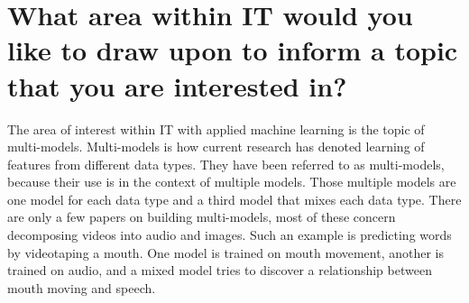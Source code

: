 \section{What area within IT would you like to draw upon to inform a topic that you are interested in?}

The area of interest within IT with applied machine learning is the topic of multi-models.  Multi-models is how current research has denoted learning of features from different data types.  They have been referred to as multi-models, because their use is in the context of multiple models.  Those multiple models are one model for each data type and a third model that mixes each data type. There are only a few papers on building multi-models, most of these concern decomposing videos into audio and images.  Such an example is predicting words by videotaping a mouth.  One model is trained on mouth movement, another is trained on audio, and a mixed model tries to discover a relationship between mouth moving and speech.  
